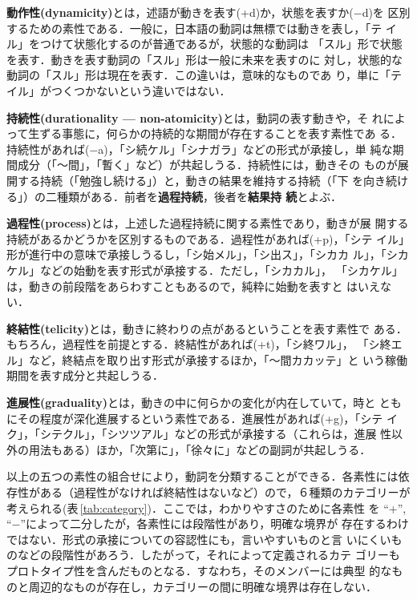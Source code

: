 {\bf 動作性(dynamicity)}とは，述語が動きを表す(+d)か，状態を表すか($-$d)を
区別するための素性である．一般に，日本語の動詞は無標では動きを表し，「テ
イル」をつけて状態化するのが普通であるが\cite{Talmy85}，状態的な動詞は
「スル」形で状態を表す．動きを表す動詞の「スル」形は一般に未来を表すのに
対し，状態的な動詞の「スル」形は現在を表す．この違いは，意味的なものであ
り，単に「テイル」がつくつかないという違いではない．

{\bf 持続性(durationality --- non-atomicity)}とは，動詞の表す動きや，そ
れによって生ずる事態に，何らかの持続的な期間が存在することを表す素性であ
る．持続性があれば($-$a)，「シ続ケル」「シナガラ」などの形式が承接し，単
純な期間成分（「〜間」，「暫く」など）が共起しうる．持続性には，動きその
ものが展開する持続（「勉強し続ける」）と，動きの結果を維持する持続（「下
を向き続ける」）の二種類がある．前者を{\bf 過程持続}，後者を{\bf 結果持
  続}とよぶ．

{\bf 過程性(process)}とは，上述した過程持続に関する素性であり，動きが展
開する持続があるかどうかを区別するものである．過程性があれば(+p)，「シテ
イル」形が進行中の意味で承接しうるし，「シ始メル」，「シ出ス」，「シカカ
ル」，「シカケル」などの始動を表す形式が承接する．ただし，「シカカル」，
「シカケル」は，動きの前段階をあらわすこともあるので，純粋に始動を表すと
はいえない．

{\bf 終結性(telicity)}とは，動きに終わりの点があるということを表す素性で
ある．もちろん，過程性を前提とする．終結性があれば(+t)，「シ終ワル」，
「シ終エル」など，終結点を取り出す形式が承接するほか，「〜間カカッテ」と
いう稼働期間を表す成分と共起しうる．

{\bf 進展性(graduality)}とは，動きの中に何らかの変化が内在していて，時と
ともにその程度が深化進展するという素性である．進展性があれば(+g)，「シテ
イク」，「シテクル」，「シツツアル」などの形式が承接する（これらは，進展
性以外の用法もある）ほか，「次第に」，「徐々に」などの副詞が共起しうる．

以上の五つの素性の組合せにより，動詞を分類することができる．各素性には依
存性がある（過程性がなければ終結性はないなど）ので，６種類のカテゴリーが
考えられる(表\,\ref{tab:category})．ここでは，わかりやすさのために各素性
を ``+'', ``$-$''によって二分したが，各素性には段階性があり，明確な境界が
存在するわけではない．形式の承接についての容認性にも，言いやすいものと言
いにくいものなどの段階性があろう．したがって，それによって定義されるカテ
ゴリーもプロトタイプ性を含んだものとなる．すなわち，そのメンバーには典型
的なものと周辺的なものが存在し，カテゴリーの間に明確な境界は存在しない．

